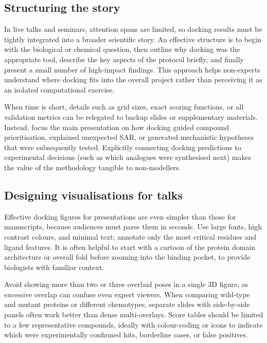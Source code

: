 \documentclass[12pt]{article}
\begin{document}
\subsection{Structuring the story}

In live talks and seminars, attention spans are limited, so docking results must be tightly integrated into a broader scientific story.\cite{CH11_Forli2015,CH11_zhu2022,CH11_Cheng2012} 
An effective structure is to begin with the biological or chemical question, then outline why docking was the appropriate tool, describe the key aspects of the protocol briefly, and finally present a small number of high-impact findings.\cite{CH11_Kitchen2004,CH11_Forli2015,CH11_Berry2015} 
This approach helps non-experts understand where docking fits into the overall project rather than perceiving it as an isolated computational exercise.\cite{CH11_Cheng2012,CH11_zhu2022,CH11_cosconati2010} 

When time is short, details such as grid sizes, exact scoring functions, or all validation metrics can be relegated to backup slides or supplementary materials.\cite{CH11_Berry2015,CH11_Forli2015,CH11_Pagadala2017} 
Instead, focus the main presentation on how docking guided compound prioritisation, explained unexpected SAR, or generated mechanistic hypotheses that were subsequently tested.\cite{CH11_Forli2015,CH11_zhu2022,CH11_BindingAffinity2018} 
Explicitly connecting docking predictions to experimental decisions (such as which analogues were synthesised next) makes the value of the methodology tangible to non-modellers.\cite{CH11_Cheng2012,CH11_Kitchen2004,CH11_cosconati2010} 

\subsection{Designing visualisations for talks}

Effective docking figures for presentations are even simpler than those for manuscripts, because audiences must parse them in seconds.\cite{CH11_Berry2015,CH11_Forli2015,CH11_zhu2022} 
Use large fonts, high contrast colours, and minimal text; annotate only the most critical residues and ligand features.\cite{CH11_Berry2015,CH11_Glide2004,CH11_Forli2015} 
It is often helpful to start with a cartoon of the protein domain architecture or overall fold before zooming into the binding pocket, to provide biologists with familiar context.\cite{CH11_zhu2022,CH11_Cheng2012,CH11_Kitchen2004} 

Avoid showing more than two or three overlaid poses in a single 3D figure, as excessive overlap can confuse even expert viewers.\cite{CH11_Berry2015,CH11_Forli2015,CH11_cosconati2010} 
When comparing wild-type and mutant proteins or different chemotypes, separate slides with side-by-side panels often work better than dense multi-overlays.\cite{Kitchen2004,Glide2004,zhu2022} 
Score tables should be limited to a few representative compounds, ideally with colour-coding or icons to indicate which were experimentally confirmed hits, borderline cases, or false positives.\cite{CH11_Forli2015,CH11_BindingAffinity2018,CH11_zhu2022} 
\end{document}
